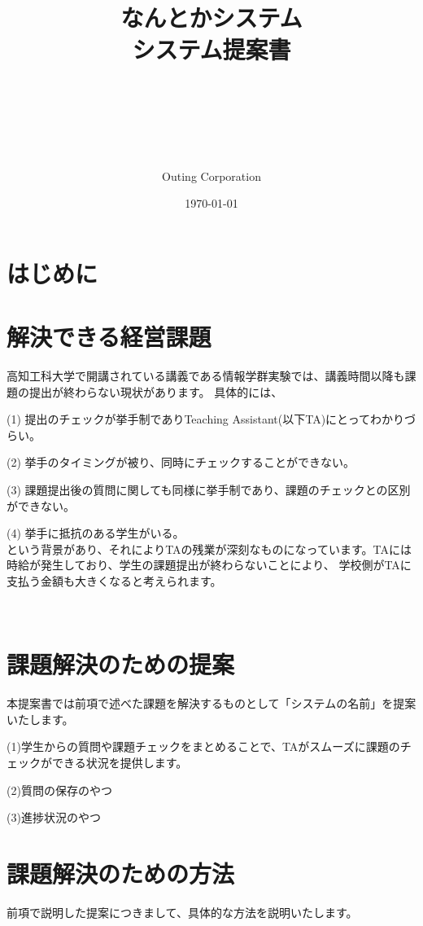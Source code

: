 \documentclass[a4j,titlepage]{ujarticle}
\title{
{なんとかシステム
\\
システム提案書}
\author{\\
\\
\\
\\
\\
Outing Corporation}
\date{\today}
}
\begin{document}
\maketitle


\tableofcontents



\clearpage


\section{はじめに}


\section{解決できる経営課題}
高知工科大学で開講されている講義である情報学群実験では、講義時間以降も課題の提出が終わらない現状があります。
具体的には、

(1) 提出のチェックが挙手制でありTeaching Assistant(以下TA)にとってわかりづらい。

(2) 挙手のタイミングが被り、同時にチェックすることができない。

(3) 課題提出後の質問に関しても同様に挙手制であり、課題のチェックとの区別ができない。

(4) 挙手に抵抗のある学生がいる。\\
という背景があり、それによりTAの残業が深刻なものになっています。TAには時給が発生しており、学生の課題提出が終わらないことにより、
学校側がTAに支払う金額も大きくなると考えられます。






\section{課題解決のための提案}
本提案書では前項で述べた課題を解決するものとして「システムの名前」を提案いたします。

(1)学生からの質問や課題チェックをまとめることで、TAがスムーズに課題のチェックができる状況を提供します。

(2)質問の保存のやつ

(3)進捗状況のやつ


\section{課題解決のための方法}
前項で説明した提案につきまして、具体的な方法を説明いたします。
\end{document}
